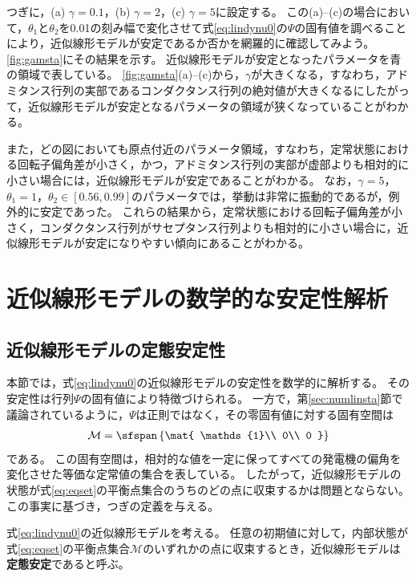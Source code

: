 \documentclass[tombow,dvipdfmx]{corona-a5-1.1}
\begin{document}
\begin{例}[近似線形モデルの数値的な安定性解析]
つぎに，(a) $\gamma=0.1$，(b) $\gamma=2$，(c) $\gamma=5$に設定する。
この(a)--(c)の場合において，$\theta_1$と$\theta_2$を0.01の刻み幅で変化させて式\ref{eq:lindynu0}の$\Psi$の固有値を調べることにより，近似線形モデルが安定であるか否かを網羅的に確認してみよう。
\ref{fig:gamsta}にその結果を示す。
近似線形モデルが安定となったパラメータを青の領域で表している。
\ref{fig:gamsta}(a)--(c)から，$\gamma$が大きくなる，すなわち，アドミタンス行列の実部であるコンダクタンス行列の絶対値が大きくなるにしたがって，近似線形モデルが安定となるパラメータの領域が狭くなっていることがわかる。

また，どの図においても原点付近のパラメータ領域，すなわち，定常状態における回転子偏角差が小さく，かつ，アドミタンス行列の実部が虚部よりも相対的に小さい場合には，近似線形モデルが安定であることがわかる。
なお，$\gamma=5$，$\theta_1=1$，$\theta_2 \in [0.56,0.99]$のパラメータでは，挙動は非常に振動的であるが，例外的に安定であった。
これらの結果から，定常状態における回転子偏角差が小さく，コンダクタンス行列がサセプタンス行列よりも相対的に小さい場合に，近似線形モデルが安定になりやすい傾向にあることがわかる。
\end{例}




\section{近似線形モデルの数学的な安定性解析\advanced}\label{sec:linmathana}

\subsection{近似線形モデルの定態安定性\advanced}

本節では，式\ref{eq:lindynu0}の近似線形モデルの安定性を数学的に解析する。
その安定性は行列$\Psi$の固有値により特徴づけられる。
一方で，第\ref{sec:numlinsta}節で議論されているように，$\Psi$は正則ではなく，その零固有値に対する固有空間は
\begin{align}\label{eq:eqset}
\mathcal{M} =
 \sfspan\left\{
 \mat{
 \mathds{1}\\
 0\\
 0
 }
 \right\}
\end{align}
である。
この固有空間は，相対的な値を一定に保ってすべての発電機の偏角を変化させた等価な定常値の集合を表している。
したがって，近似線形モデルの状態が式\ref{eq:eqset}の平衡点集合のうちのどの点に収束するかは問題とならない。
この事実に基づき，つぎの定義を与える。

\begin{定義}[近似線形モデルの定態安定性]
\label{def:stalin}
式\ref{eq:lindynu0}の近似線形モデルを考える。
任意の初期値に対して，内部状態が式\ref{eq:eqset}の平衡点集合$\mathcal{M}$のいずれかの点に収束するとき，近似線形モデルは\textbf{定態安定}であると呼ぶ。
\end{定義}
\end{document}
